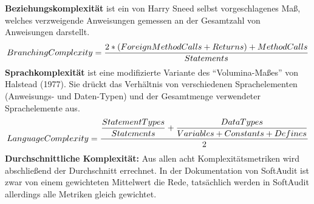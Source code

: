 \documentclass[gb,ngerman]{stthesis}
\begin{document}
			\textbf{Beziehungskomplexität} ist ein von Harry Sneed selbst vorgeschlagenes Maß, welches verzweigende Anweisungen gemessen an der Gesamtzahl von Anweisungen darstellt.
			\begin{equation}
				\small{Branching Complexity = \dfrac{2 * (ForeignMethodCalls + Returns) + MethodCalls}{Statements}} 
			\end{equation}
			\textbf{Sprachkomplexität} ist eine modifizierte Variante des "`Volumina-Maßes"' von Halstead (1977). Sie drückt das Verhältnis von verschiedenen Sprachelementen (Anweisungs- und Daten-Typen) und der Gesamtmenge verwendeter Sprachelemente aus.
			\begin{equation}
				\small{Language Complexity = \dfrac{\dfrac{StatementTypes}{Statements} + \dfrac{DataTypes}{Variables  + Constants + Defines}}{2}} 
			\end{equation}
			\textbf{Durchschnittliche Komplexität:} Aus allen acht Komplexitätsmetriken wird abschließend der Durchschnitt errechnet. In der Dokumentation von SoftAudit ist zwar von einem gewichteten Mittelwert die Rede, tatsächlich werden in SoftAudit allerdings alle Metriken gleich gewichtet.
\end{document}

